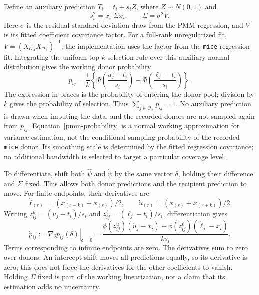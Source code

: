 Define an auxiliary prediction \(T_i=t_i+s_i Z\), where
\(Z\sim N(0,1)\) and
\[
s_i^2=x_i^\top\Sigma x_i,\qquad \Sigma=\sigma^2 V.
\]
Here \(\sigma\) is the residual standard-deviation draw from the PMM
regression, and \(V\) is its fitted coefficient covariance factor.
For a full-rank unregularized fit,
\(V=(X_{\mathcal O_A}^\top X_{\mathcal O_A})^{-1}\); the implementation
uses the factor from the \texttt{mice} regression fit. Integrating the
uniform top-\(k\) selection rule over this auxiliary normal distribution
gives the working donor probability
\begin{equation}
p_{ij}=\frac{1}{k}
\left\{\Phi\!\left(\frac{u_j-t_i}{s_i}\right)
-\Phi\!\left(\frac{\ell_j-t_i}{s_i}\right)\right\}.
\label{pmm-probability}
\end{equation}
The expression in braces is the probability of entering the donor pool;
division by \(k\) gives the probability of selection. Thus
\(\sum_{j\in\mathcal O_A}p_{ij}=1\). No auxiliary prediction is drawn
when imputing the data, and the recorded donors are not sampled again
from \(p_{ij}\). Equation~\eqref{pmm-probability} is a normal working
approximation for variance estimation, not the conditional sampling
probability of the recorded \texttt{mice} donor. Its smoothing scale is
determined by the fitted regression covariance; no additional bandwidth
is selected to target a particular coverage level.

To differentiate, shift both \(\hat\psi\) and \(\dot\psi\) by the same
vector \(\delta\), holding their difference and \(\Sigma\) fixed. This
allows both donor predictions and the recipient prediction to move.
For finite endpoints, their derivatives are
\[
\dot\ell_{(r)}=(x_{(r-k)}+x_{(r)})/2,\qquad
\dot u_{(r)}=(x_{(r)}+x_{(r+k)})/2.
\]
Writing \(z_{ij}^{u}=(u_j-t_i)/s_i\) and
\(z_{ij}^{\ell}=(\ell_j-t_i)/s_i\), differentiation gives
\begin{equation}
\dot p_{ij}:=\left.\nabla_\delta p_{ij}(\delta)\right|_{\delta=0}
=\frac{\phi(z_{ij}^{u})(\dot u_j-x_i)
-\phi(z_{ij}^{\ell})(\dot\ell_j-x_i)}{k s_i}.
\label{pmm-probability-derivative}
\end{equation}
Terms corresponding to infinite endpoints are zero. The derivatives
sum to zero over donors. An intercept shift moves all predictions
equally, so its derivative is zero; this does not force the derivatives
for the other coefficients to vanish. Holding \(\Sigma\) fixed is part
of the working linearization, not a claim that its estimation adds no
uncertainty.

